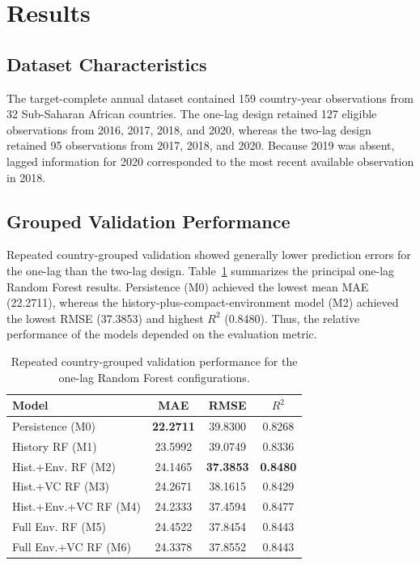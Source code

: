 \documentclass[10pt,twocolumn]{article}
\begin{document}
\section{Results}

\subsection{Dataset Characteristics}

The target-complete annual dataset contained 159 country-year
observations from 32 Sub-Saharan African countries. The one-lag design
retained 127 eligible observations from 2016, 2017, 2018, and 2020,
whereas the two-lag design retained 95 observations from 2017, 2018,
and 2020. Because 2019 was absent, lagged information for 2020
corresponded to the most recent available observation in 2018.


\subsection{Grouped Validation Performance}

Repeated country-grouped validation showed generally lower prediction
errors for the one-lag than the two-lag design. Table~\ref{tab:grouped_results}
summarizes the principal one-lag Random Forest results. Persistence
(M0) achieved the lowest mean MAE (22.2711), whereas the
history-plus-compact-environment model (M2) achieved the lowest RMSE
(37.3853) and highest \(R^2\) (0.8480). Thus, the relative performance
of the models depended on the evaluation metric.

\begin{table}[!t]
\centering
\caption{Repeated country-grouped validation performance for the
one-lag Random Forest configurations.}
\label{tab:grouped_results}
\small
\setlength{\tabcolsep}{4pt}
\begin{tabular}{lccc}
\toprule
Model & MAE & RMSE & $R^2$ \\
\midrule
Persistence (M0)      & \textbf{22.2711} & 39.8300 & 0.8268 \\
History RF (M1)       & 23.5992 & 39.0749 & 0.8336 \\
Hist.+Env. RF (M2)    & 24.1465 & \textbf{37.3853} & \textbf{0.8480} \\
Hist.+VC RF (M3)      & 24.2671 & 38.1615 & 0.8429 \\
Hist.+Env.+VC RF (M4) & 24.2333 & 37.4594 & 0.8477 \\
Full Env. RF (M5)     & 24.4522 & 37.8454 & 0.8443 \\
Full Env.+VC RF (M6)  & 24.3378 & 37.8552 & 0.8443 \\
\bottomrule
\end{tabular}
\end{table}
\end{document}
